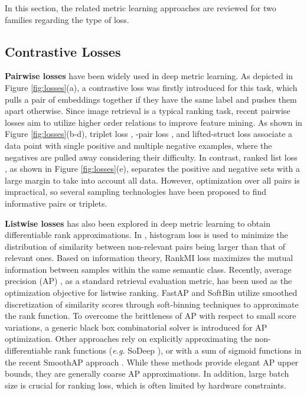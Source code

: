 \documentclass[10pt,twocolumn,letterpaper]{article}
\begin{document}
In this section, the related metric learning approaches are reviewed for two families regarding the type of loss.

\subsection{Contrastive Losses}

\textbf{Pairwise losses} have been widely used in deep metric learning. As depicted in Figure \ref{fig:losses}(a), a contrastive loss \cite{contrast} was firstly introduced for this task, which pulls a pair of embeddings together if they have the same label and pushes them apart otherwise. Since image retrieval is a typical ranking task, recent pairwise losses aim to utilize higher order relations to improve feature mining. As shown in Figure \ref{fig:losses}(b-d), triplet loss \cite{facenet}, -pair loss \cite{npair}, and lifted-struct loss associate a data point with single positive and multiple negative examples, where the negatives are pulled away considering their difficulty. In contrast, ranked list loss \cite{rll}, as shown in Figure \ref{fig:losses}(e), separates the positive and negative sets with a large margin to take into account all data. However, optimization over all pairs is impractical, so several sampling technologies \cite{sct,strategy,fanng,sh,hdc} have been proposed to find informative pairs or triplets.

\textbf{Listwise losses} has also been explored in deep metric learning to obtain differentiable rank approximations. In \cite{hl}, histogram loss is used to minimize the distribution of similarity between non-relevant pairs being larger than that of relevant ones. Based on information theory, RankMI loss \cite{rankmi} maximizes the mutual information between samples within the same semantic class. Recently, average precision (AP) \cite{ap}, as a standard retrieval evaluation metric, has been used as the optimization objective for listwise ranking. FastAP \cite{fastap} and SoftBin \cite{softbin} utilize smoothed discretization of similarity scores through soft-binning techniques to approximate the rank function. To overcome the brittleness of AP with respect to small score variations, a generic black box combinatorial solver \cite{blackbox} is introduced for AP optimization. Other approaches rely on explicitly approximating the non-differentiable rank functions (\textit{e.g.} SoDeep \cite{sodeep}), or with a sum of sigmoid functions in the recent SmoothAP approach \cite{smoothap}. While these methods provide elegant AP upper bounds, they are generally coarse AP approximations. In addition, large batch size is crucial for ranking loss, which is often limited by hardware constraints.
\end{document}
